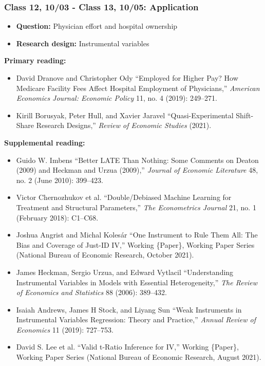 \documentclass[11pt,]{article}
\providecommand{\tightlist}{%
  \setlength{\itemsep}{0pt}\setlength{\parskip}{0pt}}
\begin{document}
\hypertarget{class-12-1003---class-13-1005-application}{%
\subsubsection{Class 12, 10/03 - Class 13, 10/05:
Application}\label{class-12-1003---class-13-1005-application}}

\begin{itemize}
\tightlist
\item
  \textbf{Question:} Physician effort and hospital ownership
\item
  \textbf{Research design:} Instrumental variables
\end{itemize}

\textbf{Primary reading:}

\begin{itemize}
\tightlist
\item
  David Dranove and Christopher Ody {``Employed for Higher Pay? {How}
  {Medicare} Facility Fees Affect Hospital Employment of Physicians,''}
  \emph{American Economics Journal: Economic Policy} 11, no. 4 (2019):
  249--271.
\item
  Kirill Borusyak, Peter Hull, and Xavier Jaravel
  {``Quasi-{Experimental} {Shift}-{Share} {Research} {Designs},''}
  \emph{Review of Economic Studies} (2021).
\end{itemize}

\textbf{Supplemental reading:}

\begin{itemize}
\tightlist
\item
  Guido W. Imbens {``Better {LATE} {Than} {Nothing}: {Some} {Comments}
  on {Deaton} (2009) and {Heckman} and {Urzua} (2009),''} \emph{Journal
  of Economic Literature} 48, no. 2 (June 2010): 399--423.
\item
  Victor Chernozhukov et al. {``Double/Debiased Machine Learning for
  Treatment and Structural Parameters,''} \emph{The Econometrics
  Journal} 21, no. 1 (February 2018): C1--C68.
\item
  Joshua Angrist and Michal Kolesár {``One {Instrument} to {Rule} {Them}
  {All}: {The} {Bias} and {Coverage} of {Just}-{ID} {IV},''} Working
  \{Paper\}, Working {Paper} {Series} (National Bureau of Economic
  Research, October 2021).
\item
  James Heckman, Sergio Urzua, and Edward Vytlacil {``Understanding
  {Instrumental} {Variables} in {Models} with {Essential}
  {Heterogeneity},''} \emph{The Review of Economics and Statistics} 88
  (2006): 389--432.
\item
  Isaiah Andrews, James H Stock, and Liyang Sun {``Weak Instruments in
  Instrumental Variables Regression: {Theory} and Practice,''}
  \emph{Annual Review of Economics} 11 (2019): 727--753.
\item
  David S. Lee et al. {``Valid t-Ratio {Inference} for {IV},''} Working
  \{Paper\}, Working {Paper} {Series} (National Bureau of Economic
  Research, August 2021).
\end{itemize}
\end{document}
